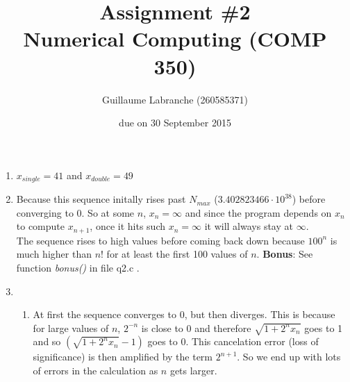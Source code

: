 \documentclass{article}
\author{Guillaume Labranche (260585371)}
\title{Assignment \#2\\Numerical Computing (COMP 350)}
\date{due on 30 September 2015}
\begin{document}
\maketitle
 
\begin{enumerate}%

\item $x_{single} = 41$ and $x_{double} = 49$

\item Because this sequence initally rises past $N_{max}$ ($3.402823466 \cdot 10^{38}$) before converging to $0$. So at some $n$, $x_n = \infty$ and since the program depends on $x_n$ to compute $x_{n+1}$, once it hits such $x_n = \infty$ it will always stay at $\infty$. \\
The sequence rises to high values before coming back down because $100^n$ is much higher than $n!$ for at least the first 100 values of $n$.
\textbf{Bonus}: See function \emph{bonus()} in file q2.c .

\item \begin{enumerate}

  \item At first the sequence converges to $0$, but then diverges. This is because for large values of $n$, $2^{-n}$ is close to 0 and therefore $\sqrt{1+2^{n}x_n}$ goes to 1 and so $(\sqrt{1+2^{n}x_n}-1)$ goes to 0. This cancelation error (loss of significance) is then amplified by the term $2^{n+1}$. So we end up with lots of errors in the calculation as $n$ gets larger.


\end{enumerate}
\end{enumerate}
\end{document}
